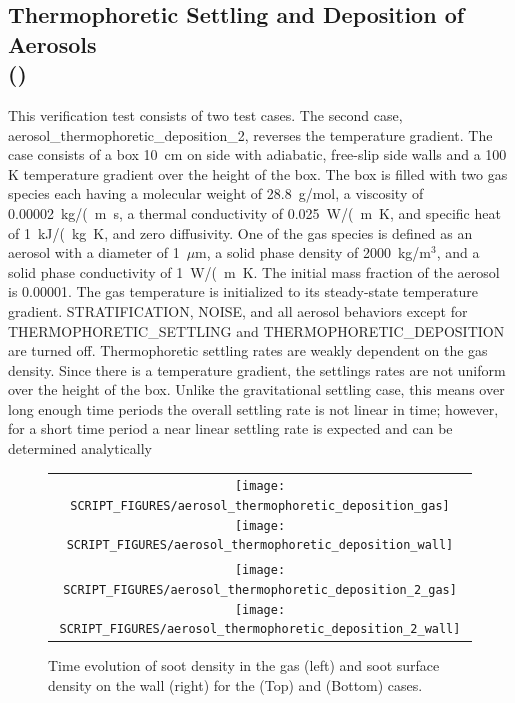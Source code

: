 \documentclass[11pt]{book}
\begin{document}
\subsection{Thermophoretic Settling and Deposition of Aerosols\\(\texorpdfstring{}{aerosol\_thermophoretic\_deposition})}
	\label{aerosol_thermophoretic_deposition}

This verification test consists of two test cases. The second case, {\ct aerosol\_thermophoretic\_deposition\_2}, reverses the temperature gradient. The case consists of a box 10~cm on side with adiabatic, free-slip side walls and a 100 K temperature gradient over the height of the box. The box is filled with two gas species each having a molecular weight of 28.8~g/mol, a viscosity of 0.00002~\si{kg/(m.s}, a thermal conductivity of 0.025~\si{W/(m.K}, and specific heat of 1~\si{kJ/(kg.K}, and zero diffusivity. One of the gas species is defined as an aerosol with a diameter of 1~$\mu$m, a solid phase density of 2000~kg/m$^3$, and a solid phase conductivity of 1~\si{W/(m.K}. The initial mass fraction of the aerosol is 0.00001. The gas temperature is initialized to its steady-state temperature gradient. {\ct STRATIFICATION}, {\ct NOISE}, and all aerosol behaviors except for {\ct THERMOPHORETIC\_SETTLING} and {\ct THERMOPHORETIC\_DEPOSITION} are turned off. Thermophoretic settling rates are weakly dependent on the gas density. Since there is a temperature gradient, the settlings rates are not uniform over the height of the box. Unlike the gravitational settling case, this means over long enough time periods the overall settling rate is not linear in time; however, for a short time period a near linear settling rate is expected and can be determined analytically

\begin{figure}[ht]
	\centering
	\begin{tabular}{c}
		\texttt{[image: SCRIPT\_FIGURES/aerosol\_thermophoretic\_deposition\_gas]}
		\texttt{[image: SCRIPT\_FIGURES/aerosol\_thermophoretic\_deposition\_wall]} \\
		\texttt{[image: SCRIPT\_FIGURES/aerosol\_thermophoretic\_deposition\_2\_gas]}
		\texttt{[image: SCRIPT\_FIGURES/aerosol\_thermophoretic\_deposition\_2\_wall]}
	\end{tabular}
	\caption[Gas phase soot densities and wall surface densities for thermophoretic deposition]{Time evolution of soot density in the gas (left) and soot surface density on the wall (right) for the  (Top) and  (Bottom) cases.}
	\label{fig:thermophoretic_deposition}
\end{figure}
\end{document}
